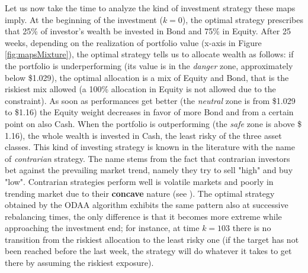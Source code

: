 Let us now take the time to analyze the kind of investment strategy these maps imply. At the beginning of the investment ($k=0$), the optimal strategy prescribes that 25\% of investor's wealth be invested in Bond and 75\% in Equity. After 25 weeks, depending on the realization of portfolio value (x-axis in Figure \ref{fig:mapsMixture}), the optimal strategy tells us to allocate wealth as follows: if the portfolio is underperforming (its value is in the \textit{danger} zone, approximately below \$1.029), the optimal allocation is a mix of Equity and Bond, that is the riskiest mix allowed (a 100\% allocation in Equity is not allowed due to the  constraint). As soon as performances get better (the \textit{neutral} zone is from \$1.029 to \$1.16) the Equity weight decreases in favor of more Bond and from a certain point on also Cash. When the portfolio is outperforming (the \textit{safe} zone is above \$ 1.16), the whole wealth is invested in Cash, the least risky of the three asset classes. This kind of investing strategy is known in the literature with the name of \textit{contrarian} strategy. The name stems from the fact that contrarian investors bet against the prevailing market trend, namely they try to sell "high" and buy "low". Contrarian strategies perform well is volatile markets and poorly in trending market due to their \textbf{concave} nature (see \cite{Perold1988}). The optimal strategy obtained by the ODAA algorithm exhibits the same pattern also at successive rebalancing times, the only difference is that it becomes more extreme while approaching the investment end; for instance, at time $k=103$ there is no transition from the riskiest allocation to the least risky one (if the target has not been reached before the last week, the strategy will do whatever it takes to get there by assuming the riskiest exposure).

